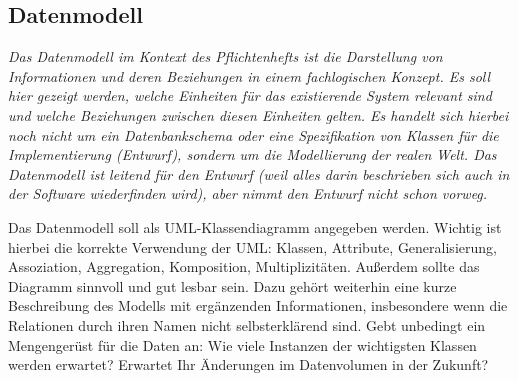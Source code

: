 \documentclass[fontsize=12pt,paper=a4,twoside]{scrartcl}
\begin{document}
\subsection{Datenmodell}
  {\em Das Datenmodell im Kontext des Pflichtenhefts ist {\glqq}die
  Darstellung von Informationen und deren Beziehungen in einem
  fachlogischen Konzept{\grqq}. Es soll hier gezeigt werden, welche
  Einheiten für das existierende System relevant sind und welche
  Beziehungen zwischen diesen Einheiten gelten. Es handelt sich
  hierbei noch nicht um ein Datenbankschema oder eine Spezifikation
  von Klassen für die Implementierung (Entwurf), sondern um die
  Modellierung der realen Welt. Das Datenmodell ist leitend für den
  Entwurf (weil alles darin beschrieben sich auch in der Software 
  wiederfinden wird), aber nimmt den Entwurf nicht schon vorweg.
  
  Das Datenmodell soll als UML-Klassendiagramm angegeben werden.
  Wichtig ist hierbei die korrekte Verwendung der UML: Klassen,
  Attribute, Generalisierung, Assoziation, Aggregation, Komposition,
  Multiplizitäten. Außerdem sollte das Diagramm sinnvoll und gut
  lesbar sein. Dazu gehört weiterhin eine kurze Beschreibung des
  Modells mit ergänzenden Informationen, insbesondere wenn die
  Relationen durch ihren Namen nicht selbsterklärend sind. Gebt
  unbedingt ein Mengengerüst für die Daten an: Wie viele Instanzen der
  wichtigsten Klassen werden erwartet? Erwartet Ihr Änderungen im
  Datenvolumen in der Zukunft?}
\end{document}
